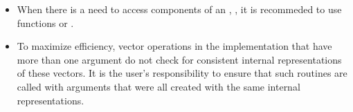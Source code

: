 \begin{itemize}

\item
  When there is a need to access components of an , ,
  it is recommeded to use functions  or
  .


\item
  {\warn}To maximize efficiency, vector operations in the {\nvecraja} implementation
  that have more than one  argument do not check for
  consistent internal representations of these vectors. It is the user's
  responsibility to ensure that such routines are called with 
  arguments that were all created with the same internal representations.

\end{itemize}

